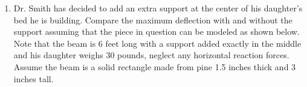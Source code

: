 \documentclass[12pt, oneside]{article}
\begin{document}
\begin{enumerate}
	\item 
		Dr. Smith has decided to add an extra support at the center of his daughter's bed he is building.
		Compare the maximum deflection with and without the support assuming that the piece in question can be modeled as shown below.
		Note that the beam is 6 feet long with a support added exactly in the middle and his daughter weighs 30 pounds, neglect any horizontal reaction forces.
		Assume the beam is a solid rectangle made from pine 1.5 inches thick and 3 inches tall.
		\begin{figure}[htpb]
		\begin{center}
		\end{center}
		\end{figure}

\end{enumerate}
\end{document}

